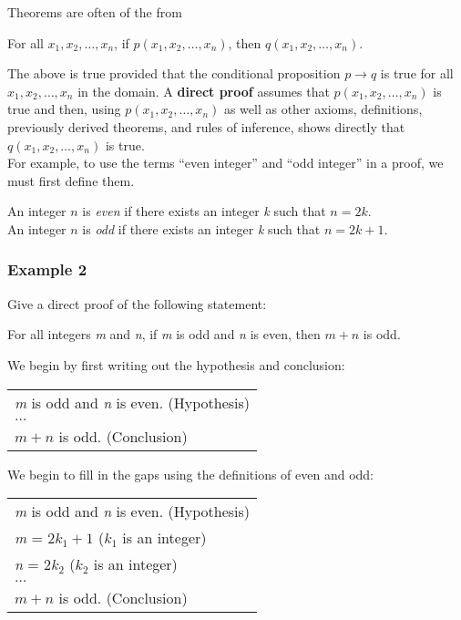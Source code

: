 Theorems are often of the from
\begin{center}
    For all $x_1, x_2, \dots, x_n$, if $p(x_1, x_2, \dots, x_n)$, then $q(x_1, x_2, \dots, x_n)$.
\end{center}

The above is true provided that the conditional proposition $p \rightarrow q$ is true for all $x_1, x_2, \dots, x_n$ in the domain.  A \textbf{direct proof} assumes that $p(x_1, x_2, \dots, x_n)$ is true and then, using $p(x_1, x_2, \dots, x_n)$ as well as other axioms, definitions, previously derived theorems, and rules of inference, shows directly that $q(x_1, x_2, \dots, x_n)$ is true.\\

For example, to use the terms ``even integer'' and ``odd integer'' in a proof, we must first define them.
\begin{center}
    An integer $n$ is \textit{even} if there exists an integer \textit{k} such that $n = 2k$.\\
    An integer $n$ is \textit{odd} if there exists an integer \textit{k} such that $n = 2k + 1$.
\end{center}

\subsubsection*{Example 2}

Give a direct proof of the following statement:
\begin{center}
    For all integers \textit{m} and \textit{n}, if \textit{m} is odd and \textit{n} is even, then $m + n$ is odd.
\end{center}

We begin by first writing out the hypothesis and conclusion:

\begin{table}[h]
\centering
\begin{tabular}{l}
\textit{m} is odd and \textit{n} is even. (Hypothesis)\\
$\dots$\\
$m + n$ is odd. (Conclusion)
\end{tabular}
\end{table}

We begin to fill in the gaps using the definitions of even and odd:

\begin{table}[h]
\centering
\begin{tabular}{l}
\textit{m} is odd and \textit{n} is even. (Hypothesis)\\
\textit{m} = $2k_1 + 1$ ($k_1$ is an integer)\\
\textit{n} = $2k_2$ ($k_2$ is an integer)\\
$\dots$\\
$m + n$ is odd. (Conclusion)
\end{tabular}
\end{table}

